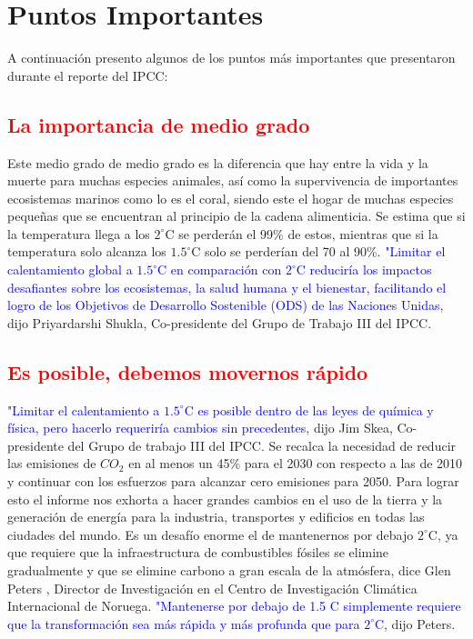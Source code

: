 \section{Puntos Importantes}
A continuación presento algunos de los puntos más importantes que presentaron durante el reporte del IPCC: 


\subsection{\textcolor{red}{La importancia de medio grado}}
Este medio grado de medio grado es la diferencia que hay entre la vida y la muerte para muchas especies animales, así como la supervivencia de importantes ecosistemas marinos como lo es el coral, siendo este el hogar de muchas especies pequeñas que se encuentran al principio de la cadena alimenticia. Se estima que si la temperatura llega a los $2^\circ$C se perderán el 99\% de estos, mientras que si la temperatura solo alcanza los $1.5^\circ$C solo se perderían del 70 al 90\%. \textcolor{blue}{"Limitar el calentamiento global a $1.5^\circ$C en comparación con $2^\circ$C reduciría los impactos desafiantes sobre los ecosistemas, la salud humana y el bienestar, facilitando el logro de los Objetivos de Desarrollo Sostenible (ODS) de las Naciones Unidas}, dijo Priyardarshi Shukla, Co-presidente del Grupo de Trabajo III del IPCC.

\subsection{\textcolor{red}{Es posible, debemos movernos rápido}}
\textcolor{blue}{"Limitar el calentamiento a $1.5^\circ$C es posible dentro de las leyes de química y física, pero hacerlo requeriría cambios sin precedentes}, dijo Jim Skea, Co-presidente del Grupo de trabajo III del IPCC. Se recalca la necesidad de reducir las emisiones de $CO_2$ en al menos un 45\% para el 2030 con respecto a las de 2010 y continuar con los esfuerzos para alcanzar cero emisiones para 2050. Para lograr esto el informe nos exhorta a hacer grandes cambios en el uso de la tierra y la generación de energía para la industria, transportes y edificios en todas las ciudades del mundo. Es un desafío enorme el de mantenernos por debajo $2^\circ$C, ya que requiere que la infraestructura de combustibles fósiles se elimine gradualmente y que se elimine carbono a gran escala de la atmósfera, dice Glen Peters , Director de Investigación en el Centro de Investigación Climática Internacional de Noruega. \textcolor{blue}{"Mantenerse por debajo de 1.5 C simplemente requiere que la transformación sea más rápida y más profunda que para $2^\circ$C}, dijo Peters.

